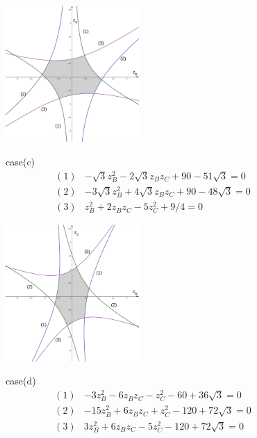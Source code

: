 \documentclass[suppldata, dvipdfmx]{interact}
\theoremstyle{plain}%
\theoremstyle{definition}
\theoremstyle{remark}
\theoremstyle{problemstyle}
\begin{document}
\begin{figure}[h!tbp]
 \begin{minipage}[]{0.5\textwidth}
 \centering
 \includegraphics[width=2in,
 keepaspectratio]{./img/graph/cubeC.png}
 \caption{}
 \label{fig:graphCubeC}
 \end{minipage}
 \hspace*{\fill}
 \begin{minipage}[]{0.5\textwidth}
  \centering
  case(c)
  \begin{align*}
   (1)& -\sqrt{3}z_B^2 - 2\sqrt{3}z_Bz_C + 90 - 51\sqrt{3} = 0\\
   (2)& -3\sqrt{3}z_B^2 + 4\sqrt{3}z_B z_C + 90 - 48\sqrt{3} = 0\\
   (3)& z_B^2 + 2 z_B z_C - 5z_C^2 + 9/4 = 0
  \end{align*}
 \end{minipage}
 \hspace*{\fill}
\end{figure}

\begin{figure}[h!tbp]
 \begin{minipage}[]{0.5\textwidth}
 \centering
 \includegraphics[width=2in,
 keepaspectratio]{./img/graph/cubeD.png}
 \caption{}
 \label{fig:graphCubeD}
 \end{minipage}
 \hspace*{\fill}
 \begin{minipage}[]{0.5\textwidth}
  \centering
  case(d)
  \begin{align*}
   (1)& -3z_B^2 - 6z_B z_C - z_C^2 -60 +36\sqrt{3} = 0\\
   (2)& -15 z_B^2 + 6z_Bz_C + z_C^2 - 120 + 72\sqrt{3} = 0\\
   (3)& 3z_B^2 + 6z_Bz_C - 5z_C^2 - 120 + 72 \sqrt{3} = 0
  \end{align*}
 \end{minipage}
 \hspace*{\fill}
\end{figure}
\end{document}
